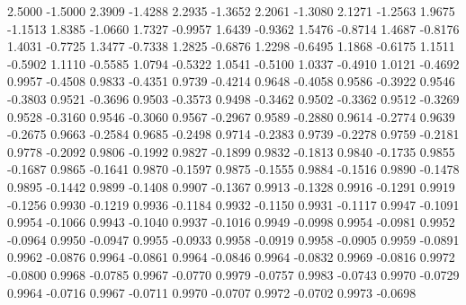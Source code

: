     2.5000   -1.5000
    2.3909   -1.4288
    2.2935   -1.3652
    2.2061   -1.3080
    2.1271   -1.2563
    1.9675   -1.1513
    1.8385   -1.0660
    1.7327   -0.9957
    1.6439   -0.9362
    1.5476   -0.8714
    1.4687   -0.8176
    1.4031   -0.7725
    1.3477   -0.7338
    1.2825   -0.6876
    1.2298   -0.6495
    1.1868   -0.6175
    1.1511   -0.5902
    1.1110   -0.5585
    1.0794   -0.5322
    1.0541   -0.5100
    1.0337   -0.4910
    1.0121   -0.4692
    0.9957   -0.4508
    0.9833   -0.4351
    0.9739   -0.4214
    0.9648   -0.4058
    0.9586   -0.3922
    0.9546   -0.3803
    0.9521   -0.3696
    0.9503   -0.3573
    0.9498   -0.3462
    0.9502   -0.3362
    0.9512   -0.3269
    0.9528   -0.3160
    0.9546   -0.3060
    0.9567   -0.2967
    0.9589   -0.2880
    0.9614   -0.2774
    0.9639   -0.2675
    0.9663   -0.2584
    0.9685   -0.2498
    0.9714   -0.2383
    0.9739   -0.2278
    0.9759   -0.2181
    0.9778   -0.2092
    0.9806   -0.1992
    0.9827   -0.1899
    0.9832   -0.1813
    0.9840   -0.1735
    0.9855   -0.1687
    0.9865   -0.1641
    0.9870   -0.1597
    0.9875   -0.1555
    0.9884   -0.1516
    0.9890   -0.1478
    0.9895   -0.1442
    0.9899   -0.1408
    0.9907   -0.1367
    0.9913   -0.1328
    0.9916   -0.1291
    0.9919   -0.1256
    0.9930   -0.1219
    0.9936   -0.1184
    0.9932   -0.1150
    0.9931   -0.1117
    0.9947   -0.1091
    0.9954   -0.1066
    0.9943   -0.1040
    0.9937   -0.1016
    0.9949   -0.0998
    0.9954   -0.0981
    0.9952   -0.0964
    0.9950   -0.0947
    0.9955   -0.0933
    0.9958   -0.0919
    0.9958   -0.0905
    0.9959   -0.0891
    0.9962   -0.0876
    0.9964   -0.0861
    0.9964   -0.0846
    0.9964   -0.0832
    0.9969   -0.0816
    0.9972   -0.0800
    0.9968   -0.0785
    0.9967   -0.0770
    0.9979   -0.0757
    0.9983   -0.0743
    0.9970   -0.0729
    0.9964   -0.0716
    0.9967   -0.0711
    0.9970   -0.0707
    0.9972   -0.0702
    0.9973   -0.0698